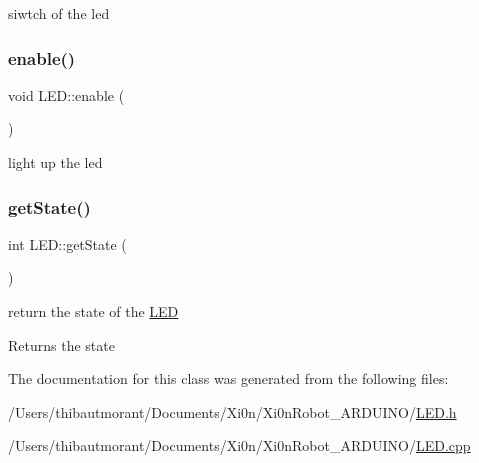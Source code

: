 siwtch of the led 

\mbox{\label{class_l_e_d_ad49b7b4dd1e4d8ad667da1be9ce7bcf5}} 
\subsubsection{\texorpdfstring{enable()}{enable()}}
{\footnotesize\ttfamily void L\+E\+D\+::enable (\begin{DoxyParamCaption}{ }\end{DoxyParamCaption})}



light up the led 

\mbox{\label{class_l_e_d_a856e5728756d749bc127e9383f2216a6}} 
\subsubsection{\texorpdfstring{get\+State()}{getState()}}
{\footnotesize\ttfamily int L\+E\+D\+::get\+State (\begin{DoxyParamCaption}{ }\end{DoxyParamCaption})}



return the state of the \hyperlink{class_l_e_d}{L\+ED} 

\begin{DoxyReturn}{Returns}
the state 
\end{DoxyReturn}


The documentation for this class was generated from the following files\+:\begin{DoxyCompactItemize}
\item 
/\+Users/thibautmorant/\+Documents/\+Xi0n/\+Xi0n\+Robot\+\_\+\+A\+R\+D\+U\+I\+N\+O/\hyperlink{_l_e_d_8h}{L\+E\+D.\+h}\item 
/\+Users/thibautmorant/\+Documents/\+Xi0n/\+Xi0n\+Robot\+\_\+\+A\+R\+D\+U\+I\+N\+O/\hyperlink{_l_e_d_8cpp}{L\+E\+D.\+cpp}\end{DoxyCompactItemize}
